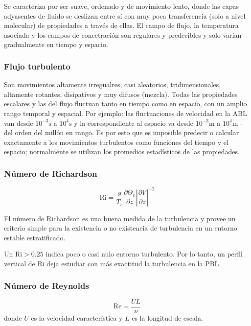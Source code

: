 \documentclass[openany,a4]{book}
\begin{document}
Se caracteriza por ser suave, ordenado y de movimiento lento, donde 
las capas adyasentes de fluido se deslizan entre sí con muy poca 
transferencia (solo a nivel molecular) de propiedades a través de 
ellas. El campo de flujo, la temperatura asociada y los campos de 
concetración son regulares y predecibles y solo varían gradualmente 
en tiempo y espacio.

\subsubsection{Flujo turbulento}

Son movimientos altamente irregualres, casi aleatorios, 
tridimensionales, altamente rotantes, disipativos y muy difusos 
(mezcla). Todas las propiedades escalares y las del flujo 
fluctuan tanto en tiempo como en espacio, con un amplio rango 
temporal y espacial. Por ejemplo: las fluctuaciones de velocidad en 
la ABL van desde $10^{-3}\mathrm{s}$ a $10^4\mathrm{s}$ y la 
correspondiente al espacio va desde $10^{-3}\mathrm{m}$ a 
$10^4\mathrm{m}$ - del orden del millón en rango. Es por esto 
que es imposible predecir o calcular exactamente a los movimientos 
turbulentos como funciones del tiempo y el espacio; normalmente 
se utilizan los promedios estadísticos de las propiedades.

\subsubsection{Número de Richardson}
\begin{equation}
    \mathrm{Ri}=\frac{g}{T_{v}}\frac{\partial \Theta_{v}}{\partial z}\left|\frac{\partial V}{\partial z}\right|^{-2}
\end{equation}
\par El número de Richardson es una buena medida de la 
turbulencia y provee un criterio simple para la existencia o no 
existencia de turbulencia en un entorno estable estratificado.
\par Un $\mathrm{Ri}>0.25$ indica poco o casi nulo entorno 
turbulento. Por lo tanto, un perfil vertical de $\mathrm{Ri}$ 
deja estudiar con más exactitud la turbulencia en la PBL.

\subsubsection{Número de Reynolds}
\begin{equation}
    \mathrm{Re}=\frac{UL}{\nu}
\end{equation}
donde $U$ es la velocidad característica y $L$ es la longitud de 
escala.
\end{document}
